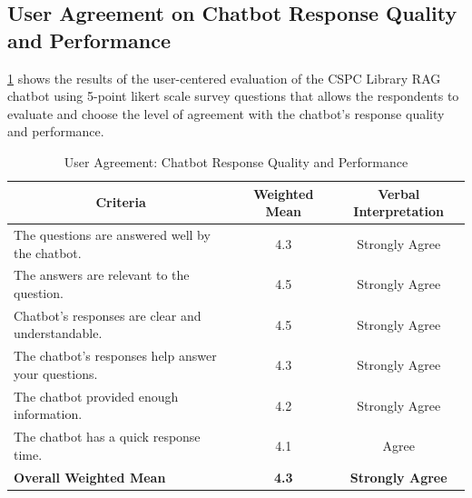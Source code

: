 \begin{refsection}
\section*{User Agreement on Chatbot Response Quality and Performance}
\ref{tab:user_agreement_quality} shows the results of the user-centered evaluation of the CSPC Library RAG chatbot using 5-point likert scale survey questions that allows the respondents to evaluate and choose the level of agreement with the chatbot’s response quality and performance.

\begin{table}[H]
    \centering
    \caption{User Agreement: Chatbot Response Quality and Performance}
    \label{tab:user_agreement_quality}
    \begin{tabular}{p{7cm} c c}
        \hline
        \multicolumn{1}{c}{\textbf{Criteria}} & \textbf{Weighted Mean} & \textbf{Verbal Interpretation} \\
        \hline
        The questions are answered well by the chatbot. & 4.3 & Strongly Agree \\
        \hline
        The answers are relevant to the question. & 4.5 & Strongly Agree \\
        \hline
        Chatbot’s responses are clear and understandable. & 4.5 & Strongly Agree \\
        \hline
        The chatbot’s responses help answer your questions. & 4.3 & Strongly Agree \\
        \hline
        The chatbot provided enough information. & 4.2 & Strongly Agree \\
        \hline
        The chatbot has a quick response time. & 4.1 & Agree \\
        \hline
        \textbf{Overall Weighted Mean} & \textbf{4.3} & \textbf{Strongly Agree} \\
        \hline
    \end{tabular}
\end{table}


\end{refsection}
